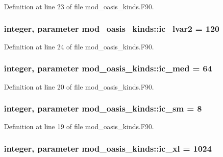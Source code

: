 Definition at line 23 of file mod\+\_\+oasis\+\_\+kinds.\+F90.

\hypertarget{classmod__oasis__kinds_abeab7014394cb77b89575d5d93e5f637}{
\subsubsection[{ic\+\_\+lvar2}]{\setlength{\rightskip}{0pt plus 5cm}integer, parameter mod\+\_\+oasis\+\_\+kinds\+::ic\+\_\+lvar2 = 120}}\label{classmod__oasis__kinds_abeab7014394cb77b89575d5d93e5f637}


Definition at line 24 of file mod\+\_\+oasis\+\_\+kinds.\+F90.

\hypertarget{classmod__oasis__kinds_a152059eec479887a8347b0f21d30d600}{
\subsubsection[{ic\+\_\+med}]{\setlength{\rightskip}{0pt plus 5cm}integer, parameter mod\+\_\+oasis\+\_\+kinds\+::ic\+\_\+med = 64}}\label{classmod__oasis__kinds_a152059eec479887a8347b0f21d30d600}


Definition at line 20 of file mod\+\_\+oasis\+\_\+kinds.\+F90.

\hypertarget{classmod__oasis__kinds_a1a914199db5381b8d08453c7cb468a71}{
\subsubsection[{ic\+\_\+sm}]{\setlength{\rightskip}{0pt plus 5cm}integer, parameter mod\+\_\+oasis\+\_\+kinds\+::ic\+\_\+sm = 8}}\label{classmod__oasis__kinds_a1a914199db5381b8d08453c7cb468a71}


Definition at line 19 of file mod\+\_\+oasis\+\_\+kinds.\+F90.

\hypertarget{classmod__oasis__kinds_a8da8fcfc62bc8c67614f998f57e7e3fc}{
\subsubsection[{ic\+\_\+xl}]{\setlength{\rightskip}{0pt plus 5cm}integer, parameter mod\+\_\+oasis\+\_\+kinds\+::ic\+\_\+xl = 1024}}\label{classmod__oasis__kinds_a8da8fcfc62bc8c67614f998f57e7e3fc}



